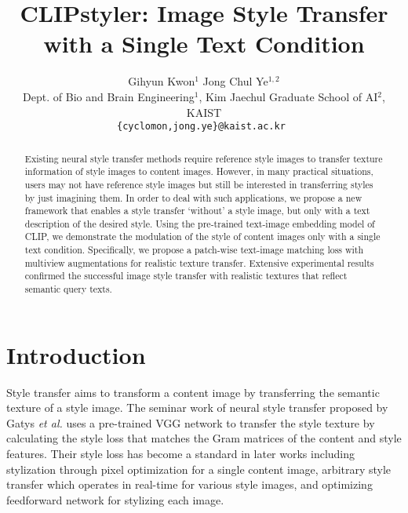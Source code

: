 \documentclass[10pt,twocolumn,letterpaper]{article}
\begin{document}
\title{CLIPstyler: Image Style Transfer with a Single Text Condition }
\author{ Gihyun Kwon$^{1}$ \quad\quad Jong Chul Ye$^{1,2}$\\
Dept. of Bio and Brain Engineering$^1$, %
Kim Jaechul Graduate School of AI$^2$, KAIST
\\
\tt\small \{cyclomon,jong.ye\}@kaist.ac.kr
}

\begin{abstract}
Existing neural style transfer methods require reference style images to transfer texture information of  style images to content images.
However, in many practical situations, users may not have reference style images but still be interested in transferring styles by just imagining them.
In order to deal with such applications, we propose a new framework that enables a style transfer `without' a style image, but only with a text description of the desired style.  
Using the pre-trained text-image embedding model of CLIP, we demonstrate the modulation of the style of content images only with a single text condition. 
Specifically, we propose a  patch-wise text-image matching loss with multiview augmentations for realistic texture transfer.
 Extensive experimental results confirmed the successful  image style transfer with realistic textures that reflect semantic query texts.
\end{abstract}

\section{Introduction}

Style transfer aims to transform a content image by transferring the semantic texture of a style image. The seminar work of neural style transfer proposed by Gatys {\it{et al.}}\cite{gatys} uses a pre-trained VGG network to transfer the style texture by calculating  the style loss that matches the Gram matrices of the content and style features.
Their style loss has become a standard in later works including stylization through pixel optimization for a single content image\cite{elad}, arbitrary style transfer which operates in real-time for various style images\cite{adain,li1,yoo,liu}, and optimizing feedforward network for stylizing each image\cite{johnson,ulyanov}. 
\end{document}
